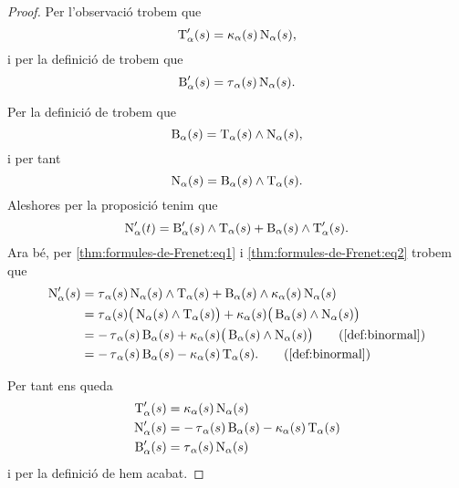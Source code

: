\documentclass[../geometria-diferencial.tex]{subfiles}
\begin{document}
    \begin{proof}
        Per l'observació  trobem que
        \begin{equation}
            \label{thm:formules-de-Frenet:eq1}
            \operatorname{T}_{\alpha}'(s)=\operatorname{\kappa}_{\alpha}(s)\operatorname{N}_{\alpha}(s),
        \end{equation}
        i per la definició de  trobem que
        \begin{equation}
            \label{thm:formules-de-Frenet:eq2}
            \operatorname{B}'_{\alpha}(s)=\operatorname{\tau}_{\alpha}(s)\operatorname{N}_{\alpha}(s).
        \end{equation}

        Per la definició de  trobem que
        \[
            \operatorname{B}_{\alpha}(s)=\operatorname{T}_{\alpha}(s)\mathbin{\wedge}\operatorname{N}_{\alpha}(s),
        \]
        i per tant %
        \[
            \operatorname{N}_{\alpha}(s)=\operatorname{B}_{\alpha}(s)\mathbin{\wedge}\operatorname{T}_{\alpha}(s).
        \]
        Aleshores per la proposició  tenim que
        \[
            \operatorname{N}'_{\alpha}(t)=\operatorname{B}'_{\alpha}(s)\mathbin{\wedge}\operatorname{T}_{\alpha}(s)+\operatorname{B}_{\alpha}(s)\mathbin{\wedge}\operatorname{T}'_{\alpha}(s).
        \]
        Ara bé, per \eqref{thm:formules-de-Frenet:eq1} i \eqref{thm:formules-de-Frenet:eq2} trobem que
        \begin{align*}
            \normal'_{\alpha}(s)&=\torsio_{\alpha}(s)\normal_{\alpha}(s)\prodvec\tangent_{\alpha}(s)+\binormal_{\alpha}(s)\prodvec\curvatura_{\alpha}(s)\normal_{\alpha}(s) \\
            &=\torsio_{\alpha}(s)\big(\normal_{\alpha}(s)\prodvec\tangent_{\alpha}(s)\big)+\curvatura_{\alpha}(s)\big(\binormal_{\alpha}(s)\prodvec\normal_{\alpha}(s)\big) \\ %
            &=-\torsio_{\alpha}(s)\binormal_{\alpha}(s)+\curvatura_{\alpha}(s)\big(\binormal_{\alpha}(s)\prodvec\normal_{\alpha}(s)\big) \tag{\ref{def:binormal}} \\
            &=-\torsio_{\alpha}(s)\binormal_{\alpha}(s)-\curvatura_{\alpha}(s)\tangent_{\alpha}(s).
            \tag{\ref{def:binormal}}
        \end{align*}

        Per tant ens queda
        \begin{align*}
            \operatorname{T}_{\alpha}'(s)&=\operatorname{\kappa}_{\alpha}(s)\operatorname{N}_{\alpha}(s) \\
            \operatorname{N}'_{\alpha}(s)&=-\operatorname{\tau}_{\alpha}(s)\operatorname{B}_{\alpha}(s)-\operatorname{\kappa}_{\alpha}(s)\operatorname{T}_{\alpha}(s) \\
            \operatorname{B}'_{\alpha}(s)&=\operatorname{\tau}_{\alpha}(s)\operatorname{N}_{\alpha}(s)
        \end{align*}
        i per la definició de  hem acabat.
    \end{proof}
\end{document}
